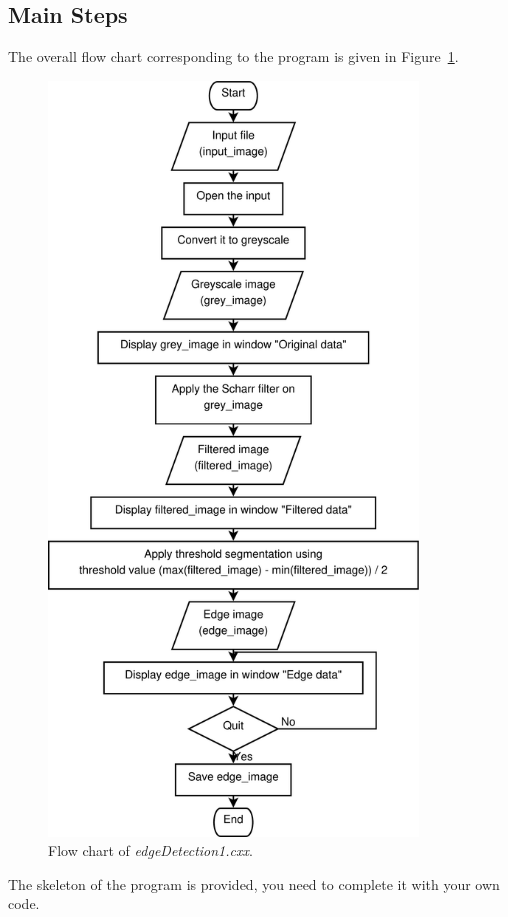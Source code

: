 \documentclass[english,a4paper,12pt,oneside]{article}
\begin{document}
\subsection{Main Steps}
The overall flow chart corresponding to the program is given in Figure~\ref{fig:flowChart}. 
\begin{figure}[htbp]
 \centering
 \includegraphics[height=20cm]{flow_chart_edge_detection}
 \caption{\label{fig:flowChart}Flow chart of \emph{edgeDetection1.cxx}.}
\end{figure}
The skeleton of the program is provided, you need to complete it with your own code. 
\end{document}
